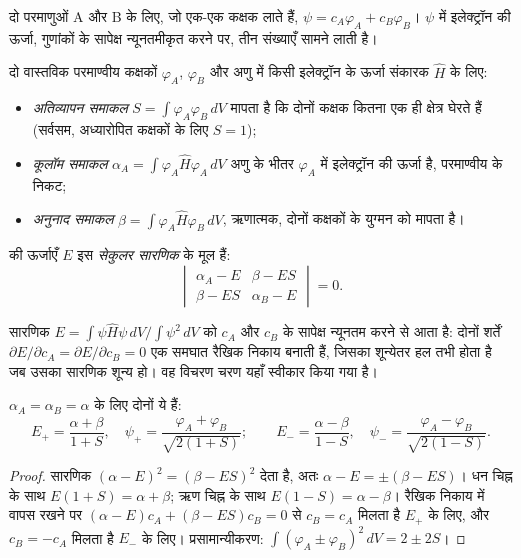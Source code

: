 दो परमाणुओं A और B के लिए, जो एक-एक कक्षक लाते हैं, $\psi = c_A\varphi_A + c_B\varphi_B$।
$\psi$ में इलेक्ट्रॉन की ऊर्जा, गुणांकों के सापेक्ष न्यूनतमीकृत करने पर,
तीन संख्याएँ सामने लाती है।

\begin{definition}[LCAO विधि के समाकल]\label{def:b2:diatomic-mos:integrals}
दो वास्तविक परमाण्वीय कक्षकों $\varphi_A$, $\varphi_B$ और अणु में किसी इलेक्ट्रॉन के
ऊर्जा संकारक $\hat H$ के लिए:
\begin{itemize}
  \item \emph{अतिव्यापन समाकल} $S = \int\varphi_A\varphi_B\,dV$
        मापता है कि दोनों कक्षक कितना एक ही क्षेत्र घेरते हैं (सर्वसम,
        अध्यारोपित कक्षकों के लिए $S = 1$);
  \item \emph{कूलॉम समाकल} $\alpha_A = \int\varphi_A\hat
        H\varphi_A\,dV$ अणु के भीतर $\varphi_A$ में इलेक्ट्रॉन की ऊर्जा है,
        परमाण्वीय  के निकट;
  \item \emph{अनुनाद समाकल} $\beta = \int\varphi_A\hat
        H\varphi_B\,dV$, ऋणात्मक, दोनों कक्षकों के युग्मन को मापता है।
\end{itemize}
 की ऊर्जाएँ $E$ इस \emph{सेकुलर
सारणिक} के मूल हैं:
\[
  \begin{vmatrix} \alpha_A - E & \beta - ES \\ \beta - ES & \alpha_B - E \end{vmatrix} = 0 .
\]
\end{definition}

सारणिक $E = \int\psi\hat H\psi\,dV/\int\psi^2\,dV$ को $c_A$ और $c_B$ के सापेक्ष
न्यूनतम करने से आता है: दोनों शर्तें $\partial E/\partial c_A =
\partial E/\partial c_B = 0$ एक समघात रैखिक निकाय बनाती हैं, जिसका शून्येतर
हल तभी होता है जब उसका सारणिक शून्य हो। वह विचरण चरण यहाँ स्वीकार
किया गया है।

\begin{theorem}[दो सर्वसम कक्षक]\label{thm:b2:diatomic-mos:homonuclear}
$\alpha_A = \alpha_B = \alpha$ के लिए दोनों  ये हैं:
\[
  E_+ = \frac{\alpha + \beta}{1 + S}, \quad \psi_+ = \frac{\varphi_A + \varphi_B}{\sqrt{2(1 + S)}} ;
  \qquad
  E_- = \frac{\alpha - \beta}{1 - S}, \quad \psi_- = \frac{\varphi_A - \varphi_B}{\sqrt{2(1 - S)}} .
\]
\end{theorem}

\begin{proof}
सारणिक $(\alpha - E)^2 = (\beta - ES)^2$ देता है, अतः $\alpha - E = \pm(\beta - ES)$।
धन चिह्न के साथ $E(1 + S) = \alpha + \beta$; ऋण चिह्न के साथ $E(1 - S) = \alpha
- \beta$। रैखिक निकाय में वापस रखने पर $(\alpha - E)c_A + (\beta - ES)c_B = 0$ से $c_B
= c_A$ मिलता है $E_+$ के लिए, और $c_B = -c_A$ मिलता है $E_-$ के लिए। प्रसामान्यीकरण: $\int(\varphi_A \pm
\varphi_B)^2\,dV = 2 \pm 2S$।
\end{proof}

